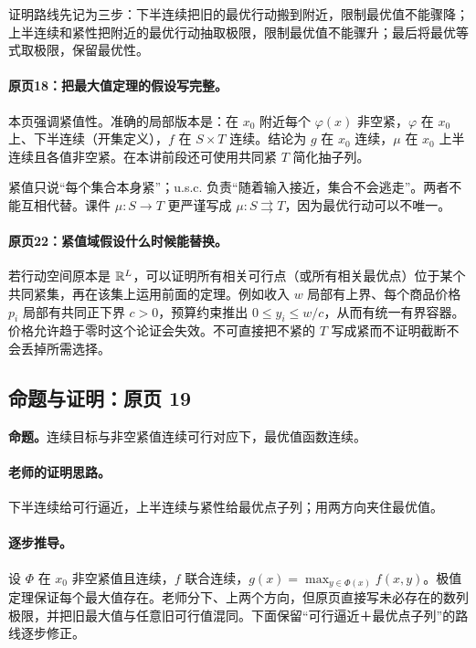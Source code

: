 证明路线先记为三步：下半连续把旧的最优行动搬到附近，限制最优值不能骤降；上半连续和紧性把附近的最优行动抽取极限，限制最优值不能骤升；最后将最优等式取极限，保留最优性。



\paragraph{原页18：把最大值定理的假设写完整。}本页强调紧值性。准确的局部版本是：在 $x_0$ 附近每个 $\varphi(x)$ 非空紧，$\varphi$ 在 $x_0$ 上、下半连续（开集定义），$f$ 在 $S\times T$ 连续。结论为 $g$ 在 $x_0$ 连续，$\mu$ 在 $x_0$ 上半连续且各值非空紧。在本讲前段还可使用共同紧 $T$ 简化抽子列。

紧值只说“每个集合本身紧”；u.s.c. 负责“随着输入接近，集合不会逃走”。两者不能互相代替。课件 $\mu:S\to T$ 更严谨写成 $\mu:S\rightrightarrows T$，因为最优行动可以不唯一。



\paragraph{原页22：紧值域假设什么时候能替换。}若行动空间原本是 $\mathbb{R}^L$，可以证明所有相关可行点（或所有相关最优点）位于某个共同紧集，再在该集上运用前面的定理。例如收入 $w$ 局部有上界、每个商品价格 $p_i$ 局部有共同正下界 $c>0$，预算约束推出 $0\le y_i\le w/c$，从而有统一有界容器。价格允许趋于零时这个论证会失效。不可直接把不紧的 $T$ 写成紧而不证明截断不会丢掉所需选择。



\subsection{命题与证明：原页 19}

\textbf{命题。}连续目标与非空紧值连续可行对应下，最优值函数连续。

\paragraph{老师的证明思路。}下半连续给可行逼近，上半连续与紧性给最优点子列；用两方向夹住最优值。

\paragraph{逐步推导。}
设 $\Phi$ 在 $x_0$ 非空紧值且连续，$f$ 联合连续，$g(x)=\max_{y\in\Phi(x)}f(x,y)$。极值定理保证每个最大值存在。老师分下、上两个方向，但原页直接写未必存在的数列极限，并把旧最大值与任意旧可行值混同。下面保留“可行逼近＋最优点子列”的路线逐步修正。
